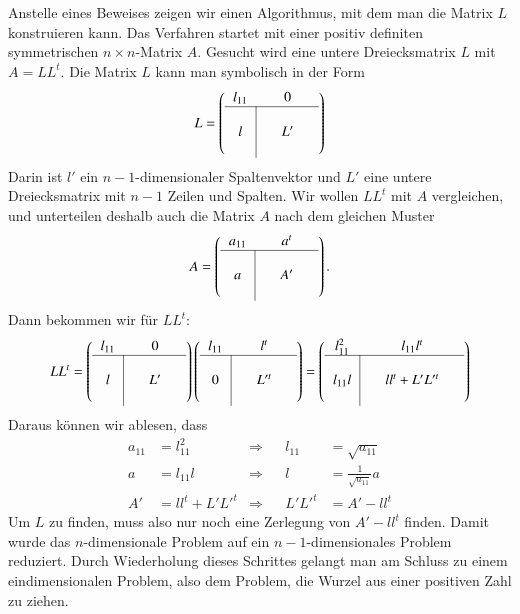Anstelle eines Beweises zeigen wir einen Algorithmus, mit dem man die Matrix
$L$ konstruieren kann.
Das Verfahren startet mit einer positiv definiten
symmetrischen $n\times n$-Matrix $A$.
Gesucht wird eine untere Dreiecksmatrix $L$
mit $A=LL^t$.
Die Matrix $L$ kann man symbolisch in der Form 
\[
L=\left(
\begin{tabular}{>{$}c<{$}|>{$}c<{$}>{$}c<{$}>{$}c<{$}}
l_{11}&&0&\\
\hline
&&&\\
l&&L'&\\
&&&
\end{tabular}
\right)
\]
Darin ist $l'$ ein $n-1$-dimensionaler Spaltenvektor und $L'$ eine
untere Dreiecksmatrix mit $n-1$ Zeilen und Spalten.
Wir wollen $LL^t$ mit $A$ vergleichen, und unterteilen deshalb auch die
Matrix $A$ nach dem gleichen Muster
\[
A=\left(
\begin{tabular}{>{$}c<{$}|>{$}c<{$}>{$}c<{$}>{$}c<{$}}
a_{11}&&a^t&\\
\hline
&&&\\
a&&A'&\\
&&&
\end{tabular}
\right).
\]
Dann bekommen wir für $LL^t$:
\[
LL^t=
\left(
\begin{tabular}{>{$}c<{$}|>{$}c<{$}>{$}c<{$}>{$}c<{$}}
l_{11}&&0&\\
\hline
&&&\\
l&&L'&\\
&&&
\end{tabular}
\right)
\left(
\begin{tabular}{>{$}c<{$}|>{$}c<{$}>{$}c<{$}>{$}c<{$}}
l_{11}&&l^t&\\
\hline
&&&\\
0&&L'^t&\\
&&&
\end{tabular}
\right)
=
\left(
\begin{tabular}{>{$}c<{$}|>{$}c<{$}>{$}c<{$}>{$}c<{$}}
l_{11}^2&&l_{11}l^t&\\
\hline
&&&\\
l_{11}l&&ll^t+L'L'^t&\\
&&&
\end{tabular}
\right)
\]
Daraus können wir ablesen, dass 
\begin{align*}
a_{11}&=l_{11}^2   &\Rightarrow&&l_{11}&=\sqrt{a_{11}}\\
     a&=l_{11}l    &\Rightarrow&&     l&=\frac1{\sqrt{a_{11}}}a\\
    A'&=ll^t+L'L'^t&\Rightarrow&&L'L'^t&=A'-ll^t
\end{align*}
Um $L$ zu finden, muss also nur noch eine Zerlegung von $A'-ll^t$
finden.
Damit wurde das $n$-dimensionale Problem auf ein $n-1$-dimensionales
Problem reduziert.
Durch Wiederholung dieses Schrittes gelangt man am Schluss
zu einem eindimensionalen Problem, also dem Problem, die Wurzel aus einer
positiven Zahl zu ziehen.

